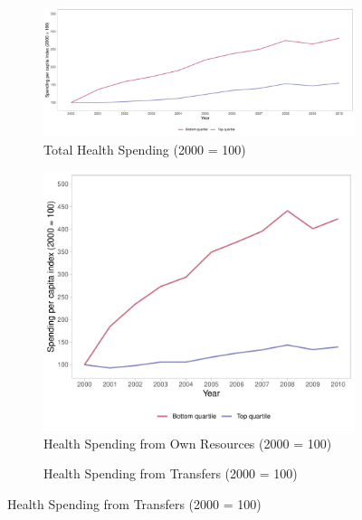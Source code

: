 \begin{figure}[h]
    \begin{center}
    \caption{\footnotesize Health Spending Trends}\label{fig:2}
    \begin{subfigure}{.9\textwidth}
        \caption{\scriptsize Total Health Spending (2000 = 100)}\label{fig:2a}
        \centering
        \includegraphics[width=\textwidth]{plots/plot_total.pdf}
    \end{subfigure}
        \begin{subfigure}{0.45\textwidth}
        \caption{\scriptsize Health Spending from Own Resources (2000 = 100)}\label{fig:2b}
        \centering
        \includegraphics[width=\textwidth]{plots/plot_own.pdf}
    \end{subfigure}
        \begin{subfigure}{0.45\textwidth}
        \caption{\scriptsize Health Spending from Transfers (2000 = 100)}\label{fig:2c}
        \centering

\end{subfigure}
\end{center}
\end{figure}
